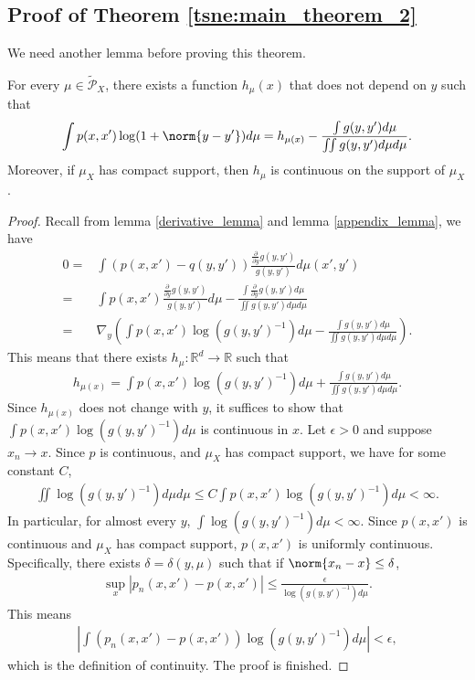 \subsection{Proof of Theorem \ref{tsne:main_theorem_2}}
We need another lemma before proving this theorem.
\begin{lemma} \label{home_stretch_lemma}
    For every $\mu \in \tilde{\mathcal{P}}_X$, there exists a function $h_{\mu}(x)$ that does not depend on $y$ such that
    \begin{align}
        \int p(x,x') \log(1+\norm{y-y'})d\mu = h_{\mu(x)} - \frac{\int g(y,y')d\mu}{\iint g(y,y')d\mu d\mu}.
    \end{align}
    Moreover, if $\mu_X$ has compact support, then $h_{\mu}$ is continuous on the support of $\mu_X$.
\end{lemma}
\begin{proof}
    Recall from lemma \ref{derivative_lemma} and lemma \ref{appendix_lemma}, we have
    \begin{align}
        0 = & \int (p(x,x')-q(y,y')) \frac{\frac{\partial}{\partial y}g(y,y')}{g(y,y')} d\mu(x',y') \nonumber                                                               \\
        =   & \int p(x,x') \frac{\frac{\partial}{\partial y}g(y,y')}{g(y,y')} d \mu -  \frac{\int \frac{\partial}{\partial y}g(y,y')d\mu}{\iint g(y,y')d\mu d\mu} \nonumber \\
        =   & \nabla_y \left(\int p(x,x') \log (g(y,y')^{-1}) d \mu -  \frac{\int g(y,y')d\mu}{\iint g(y,y')d\mu d\mu}\right).
    \end{align}
    This means that there exists $h_{\mu}: \mathbb{R}^d \to \mathbb{R}$ such that
    \begin{align}
        h_{\mu(x)} = \int p(x,x') \log(g(y,y')^{-1})d\mu + \frac{\int g(y,y')d\mu}{\iint g(y,y')d\mu d\mu}.
    \end{align}
    Since $h_{\mu(x)}$ does not change with $y$, it suffices to show that $\int p(x,x') \log(g(y,y')^{-1})d\mu$ is continuous in $x$. Let $\epsilon>0$ and suppose $x_n \to x$. Since $p$ is continuous, and $\mu_X$ has compact support, we have for some constant $C$,
    \begin{align}
        \iint \log(g(y,y')^{-1})d\mu d\mu \leq C \int p(x,x') \log(g(y,y')^{-1})d\mu < \infty.
    \end{align}
    In particular, for almost every $y$, $\int \log(g(y,y')^{-1})d\mu < \infty$. Since $p(x,x')$ is continuous and $\mu_X$ has compact support, $p(x,x')$ is uniformly continuous. Specifically, there exists $\delta = \delta(y,\mu)$ such that if $\norm{x_n-x} \leq \delta$,
    \begin{align}
        \sup_x |p_n(x,x')-p(x,x')| \leq \frac{\epsilon}{\log(g(y,y')^{-1})d\mu}.
    \end{align}
    This means
    \begin{align}
        \left|\int(p_n(x,x')-p(x,x')) \log(g(y,y')^{-1})d \mu\right| < \epsilon,
    \end{align}
    which is the definition of continuity. The proof is finished.
\end{proof}
